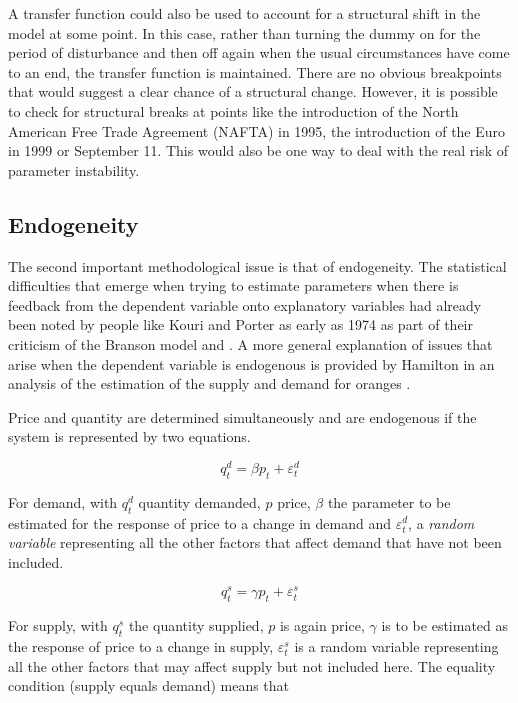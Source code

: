 \documentclass[12pt, a4paper, oneside]{article}\usepackage[]{graphicx}\usepackage[]{color}
\begin{document}
A transfer function could also be used to account for a structural shift in the model at some point.  In this case, rather than turning the dummy on for the period of disturbance and then off again when the usual circumstances have come to an end, the transfer function is maintained.  There are no obvious breakpoints that would suggest a clear chance of a structural change.  However, it is possible to check for structural breaks at points like the introduction of the North American Free Trade Agreement (NAFTA) in 1995, the introduction of the Euro in 1999 or September 11.  This would also be one way to deal with the real risk of parameter instability. 

\subsection{Endogeneity}\label{secref:endogeneity}
The second important methodological issue is that of endogeneity.  The statistical difficulties that emerge when trying to estimate parameters when there is feedback from the dependent variable onto explanatory variables had already been noted by people like Kouri and Porter as early as 1974  \citep[pp. 464-465]{Kouri1974International} as part of their criticism of the Branson model \citep{Branson1968} and \citep{Branson1971}.  A more general explanation of issues that arise when the dependent variable is endogenous is provided by Hamilton in an analysis of the estimation of the supply and demand for oranges \citep[pp. 235-238]{Hamilton}.  

Price and quantity are determined simultaneously and are endogenous if the system is represented by two equations. 

\begin{equation}
\label{eqref:demand}
q_t^d=\beta p_t + \varepsilon_t^d
\end{equation}

For demand, with $q_t^d $ quantity demanded, $p$ price, $\beta$ the parameter to be estimated for the response of price to a change in demand and $\varepsilon_t^d$, a \emph{random variable} representing all the other factors that affect demand that have not been included. 

\begin{equation}
\label{eqref:supply}
q_t^s=\gamma p_t+\varepsilon_t^s
\end{equation} 

For supply, with $q_t^s$ the quantity supplied, $p$ is again price, $\gamma$ is to be estimated as the response of price to a change in supply, $\varepsilon_t^s$ is a random variable representing all the other factors that may affect supply but not included here.  The equality condition (supply equals demand) means that  
\end{document}
